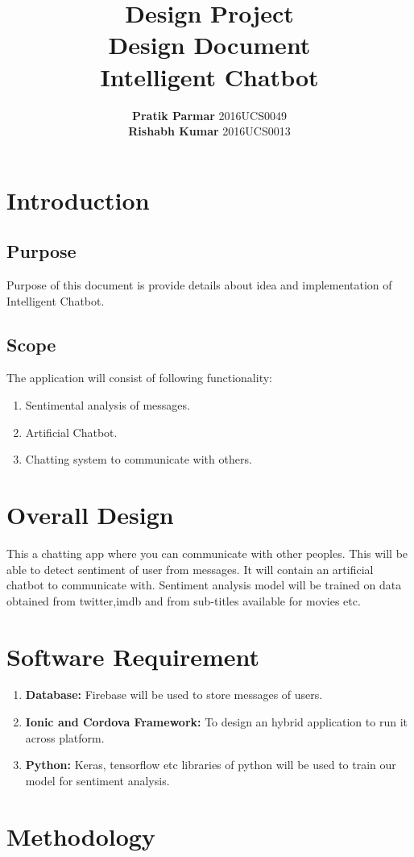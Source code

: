 \documentclass[12pt]{extarticle}
\date{}
\author{\textbf{Pratik Parmar} 2016UCS0049  \\\textbf{Rishabh Kumar} 2016UCS0013}
\title{\textbf{Design Project\\ Design Document \\ Intelligent Chatbot}}
\begin{document}
\maketitle
\newpage
\tableofcontents
\newpage
\section{Introduction}
\subsection{Purpose}
Purpose of this document is provide details about idea and implementation of Intelligent Chatbot.
\subsection{Scope}
The application will consist of following functionality:
\begin{enumerate}
\item Sentimental analysis of messages.
\item Artificial Chatbot.
\item Chatting system to communicate with others.
\end{enumerate}
\section{Overall Design}
This a chatting app where you can communicate with other peoples. This will be able to detect sentiment of user from messages. It will contain an artificial chatbot to communicate with. Sentiment analysis model will be trained on data obtained from twitter,imdb and from sub-titles available for movies etc.
\section{Software Requirement}
\begin{enumerate}
\item \textbf{Database: }Firebase will be used to store messages of users.
\item \textbf{Ionic and Cordova Framework: } To design an hybrid application to run it across platform.
\item \textbf{Python: }Keras, tensorflow etc libraries of python will be used to train our model for sentiment analysis.
\end{enumerate}
\section{Methodology}
\end{document}

